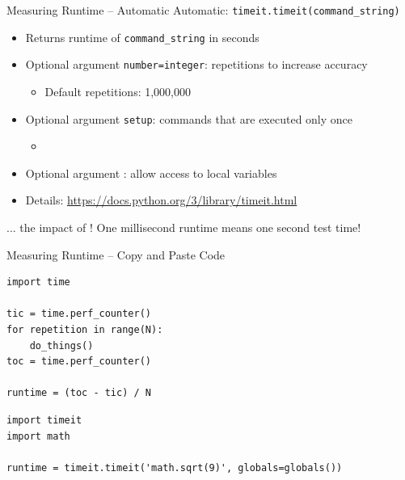 
\begin{frame}{Measuring Runtime -- Automatic}
%
Automatic: \texttt{timeit.timeit(command\_string)}
\begin{itemize}
\item Returns runtime of \texttt{command\_string} in seconds
\item Optional argument \texttt{number=integer}: repetitions to increase accuracy
	\begin{itemize}
	\item Default repetitions: 1,000,000
	\end{itemize}
\item Optional argument \texttt{setup}: commands that are executed only once
	\begin{itemize}
	\item {}
	\end{itemize}
\item Optional argument : allow access to local variables
\item Details: \url{https://docs.python.org/3/library/timeit.html}
\end{itemize}
%
\begin{hintbox}
\footnotesize
... the impact of ! One millisecond runtime means one second test time!
\end{hintbox}
%
\end{frame}


\begin{frame}[fragile]{Measuring Runtime -- Copy and Paste Code}
%
\begin{codebox}
\begin{verbatim}
import time

tic = time.perf_counter()
for repetition in range(N):
    do_things()
toc = time.perf_counter()

runtime = (toc - tic) / N
\end{verbatim}
\end{codebox}
%
\begin{codebox}
\begin{verbatim}
import timeit
import math

runtime = timeit.timeit('math.sqrt(9)', globals=globals())
\end{verbatim}
\end{codebox}
%
\end{frame}

